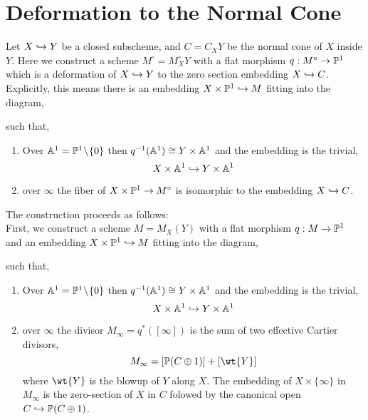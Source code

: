 \documentclass[12pt]{article}
\begin{document}
\section{Deformation to the Normal Cone}

\newcommand{\Bl}{\mathrm{Bl}}
\newcommand{\pr}{\mathrm{pr}}

Let $X \embed Y$ be a closed subscheme, and $C = C_X Y$ be the normal cone of $X$ inside $Y$. Here we construct a scheme $M^\circ = M^\circ_X Y$ with a flat morphism $q : M^\circ \to \P^1$ which is a deformation of $X \embed Y$ to the zero section embedding $X \embed C$. Explicitly, this means there is an embedding $X \times \P^1 \embed M$ fitting into the diagram,
\begin{center}
\end{center}
such that,
\begin{enumerate}
\item Over $\A^1 = \P^1 \sm \{ 0 \}$ then $q^{-1}(\A^1) \cong Y \times \A^1$ and the embedding is the trivial,
\[ X \times \A^1 \embed Y \times \A^1 \]

\item over $\infty$ the fiber of $X \times \P^1 \to M^\circ$ is isomorphic to the embedding $X \embed C$.
\end{enumerate}

The construction proceeds as follows:
\bigskip\\
First, we construct a scheme $M = M_X(Y)$ with a flat morphism $q : M \to \P^1$ and an embedding $X \times \P^1 \embed M$ fitting into the diagram,
\begin{center}
\end{center}
such that,
\begin{enumerate}
\item Over $\A^1 = \P^1 \sm \{ 0 \}$ then $q^{-1}(\A^1) \cong Y \times \A^1$ and the embedding is the trivial,
\[ X \times \A^1 \embed Y \times \A^1 \]

\item over $\infty$ the divisor $M_\infty = q^{*}([\infty])$ is the sum of two effective Cartier divisors,
\[ M_\infty = [ \P(C \oplus 1)] + [\wt{Y}] \]
where $\wt{Y}$ is the blowup of $Y$ along $X$. The embedding of $X \times \{ \infty \}$ in $M_\infty$ is the zero-section of $X$ in $C$ folowed by the canonical open $C \embed \P(C \oplus 1)$.
\end{enumerate}
\end{document}

